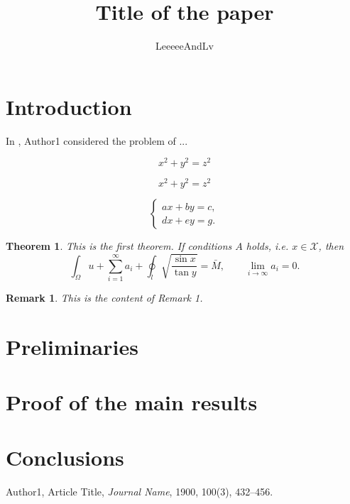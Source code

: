 \documentclass{article}
\title{Title of the paper}
\author{LeeeeeAndLv}
\date{}
\newtheorem{thm}{Theorem}
\newtheorem{rmk}{Remark}[section]
\begin{document}
\maketitle

\section{Introduction}

In \cite{Au1900}, Author1 considered the problem of ...

\begin{equation*}
	x^2 + y^2 = z^2
\end{equation*}

\begin{equation}\label{eq:GouGuThm}
	x^2 + y^2 = z^2
\end{equation}

\[
	\left\{
	\begin{aligned}
		a x + b y = c, \\
		d x + e y = g.
	\end{aligned}
	\right.
\]

\begin{thm}
	This is the first theorem. If conditions $A$ holds, i.e. $x\in \mathcal{X}$, then
	\[
		\int_\Omega u + \sum_{i=1}^\infty a_i + \oint_l \sqrt{\frac{\sin x}{\tan y}} = \bar{M}, \qquad \lim_{i\to \infty} a_i = 0.
	\]
\end{thm}

\begin{rmk}
	This is the content of Remark 1. 
\end{rmk}


\section{Preliminaries}

\section{Proof of the main results}

\section{Conclusions}

\begin{thebibliography}{99}
	Author1, Article Title, {\it Journal Name}, 1900, 100(3), 432--456.  
\end{thebibliography}
\end{document}
